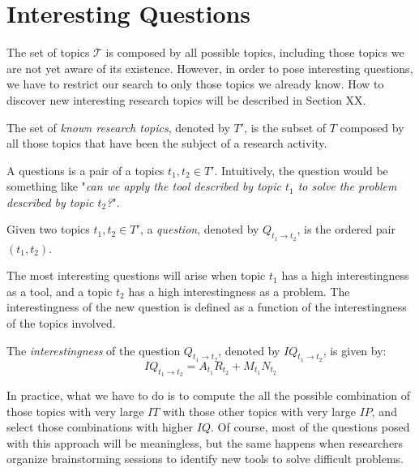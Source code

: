 %
%

\section{Interesting Questions}

The set of topics $\mathcal{T}$ is composed by all possible topics, including those topics we are not yet aware of its existence. However, in order to pose interesting questions, we have to restrict our search to only those topics we already know. How to discover new interesting research topics will be described in Section XX.

\begin{definition}
The set of \emph{known research topics}, denoted by $T'$, is the subset of $T$ composed by all those topics that have been the subject of a research activity.
\end{definition}

A questions is a pair of a topics $t_{1}, t_{2} \in T'$. Intuitively, the question would be something like "\emph{can we apply the tool described by topic $t_{1}$ to solve the problem described by topic $t_{2}$?}".

\begin{definition}
Given two topics $t_{1}, t_{2} \in T'$, a \emph{question}, denoted by $Q_{t_{1}\rightarrow t_{2}}$, is the ordered pair $\left(t_{1},t_{2}\right)$.
\end{definition}

The most interesting questions will arise when topic $t_{1}$ has a high interestingness as a tool, and a topic $t_{2}$ has a high interestingness as a problem. The interestingness of the new question is defined as a function of the interestingness of the topics involved.

\begin{definition}
The \emph{interestingness} of the question $Q_{t_{1}\rightarrow t_{2}}$, denoted by $IQ_{t_{1} \rightarrow t_{2}}$, is given by:
\[
IQ_{t_{1} \rightarrow t_{2}}=A_{t_{1}}R_{t_{2}}+M_{t_{1}}N_{t_{2}}
\]
\end{definition}

In practice, what we have to do is to compute the all the possible combination of those topics with very large $IT$ with those other topics with very large $IP$, and select those combinations with higher $IQ$. Of course, most of the questions posed with this approach will be meaningless, but the same happens when researchers organize brainstorming sessions to identify new tools to solve difficult problems.

